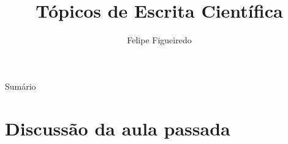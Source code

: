 \documentclass{beamer}
\title%
{Tópicos de Escrita Científica}
\subtitle
{} %
\author%
{Felipe Figueiredo}%
\institute[INTO] %
{Instituto Nacional de Traumatologia e Ortopedia
}
\date%
{}
\begin{document}
\begin{frame}
  \titlepage
\end{frame}

\begin{frame}{Sumário}
  \tableofcontents
\end{frame}








\section{Discussão da aula passada}
\end{document}
